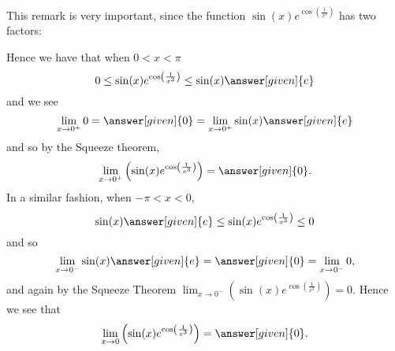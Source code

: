 \documentclass{ximera}
\begin{document}
\begin{example}
\begin{explanation}
  This remark is very important, since the function $\sin(x) e^{\cos\left(\frac{1}{x^3}\right)}$ has two factors:
    \begin{image}
    \end{image}
    Hence we have that when $0< x<\pi$
    \[
   0 \le \sin(x) e^{\cos\left(\frac{1}{x^3}\right)} \le \sin(x) \answer[given]{e}
    \]
    and we see
    \[
    \lim_{x\to 0^+}0 = \answer[given]{0} = \lim_{x\to 0^+} \sin(x) \answer[given]{e}
    \]
    and so by the Squeeze theorem,
    \[
    \lim_{x\to
      0^+}\left(\sin(x)e^{\cos\left(\frac{1}{x^3}\right)}\right)=\answer[given]{0}.
    \]
    In a similar fashion, when $-\pi<x<0$,
    \[
    \sin(x) \answer[given]{e} \le \sin(x) e^{\cos\left(\frac{1}{x^3}\right)} \le 0
    \]
    and so
    \[
    \lim_{x\to 0^-}\sin(x) \answer[given]{e} =\answer[given]{0}=\lim_{x\to 0^-}0,
    \]
    and again by the Squeeze Theorem $\lim_{x\to 0^-}\left(\sin(x)
    e^{\cos\left(\frac{1}{x^3}\right)}\right)=0$. Hence we see that
    \[
    \lim_{x\to 0}\left(\sin(x)
    e^{\cos\left(\frac{1}{x^3}\right)}\right)=\answer[given]{0}.
    \]
    

\end{explanation}
\end{example}
\end{document}
